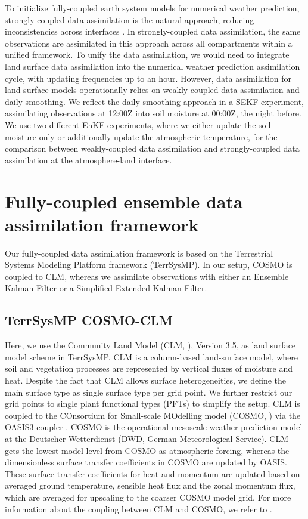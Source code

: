 \documentclass[hess, manuscript]{copernicus}
\begin{document}
To initialize fully-coupled earth system models for numerical weather prediction, strongly-coupled data assimilation is the natural approach, reducing inconsistencies across interfaces \citep{sawada_hydrometeorology_2018, lin_characteristics_2018, lin_examining_2019}.
In strongly-coupled data assimilation, the same observations are assimilated in this approach across all compartments within a unified framework.
To unify the data assimilation, we would need to integrate land surface data assimilation into the numerical weather prediction assimilation cycle, with updating frequencies up to an hour.
However, data assimilation for land surface models operationally relies on weakly-coupled data assimilation and daily smoothing.
We reflect the daily smoothing approach in a SEKF experiment, assimilating observations at 12:00Z into soil moisture at 00:00Z, the night before.
We use two different EnKF experiments, where we either update the soil moisture only or additionally update the atmospheric temperature, for the comparison between weakly-coupled data assimilation and strongly-coupled data assimilation at the atmosphere-land interface.

\section{Fully-coupled ensemble data assimilation framework}
Our fully-coupled data assimilation framework is based on the Terrestrial Systems Modeling Platform framework (TerrSysMP).
In our setup, COSMO is coupled to CLM, whereas we assimilate observations with either an Ensemble Kalman Filter or a Simplified Extended Kalman Filter.


\subsection{TerrSysMP COSMO-CLM}

Here, we use the Community Land Model (CLM, \citealt{oleson_technical_2004, oleson_k._w._improvements_2008}), Version 3.5, as land surface model scheme in TerrSysMP.
CLM is a column-based land-surface model, where soil and vegetation processes are represented by vertical fluxes of moisture and heat.
Despite the fact that CLM allows surface heterogeneities, we define the main surface type as single surface type per grid point.
We further restrict our grid points to single plant functional types (PFTs) to simplify the setup.
CLM is coupled to the COnsortium for Small-scale MOdelling model (COSMO, \citealt{baldauf_operational_2011}) via the OASIS3 coupler \citep{valcke_oasis3_2013}.
COSMO is the operational mesoscale weather prediction model at the Deutscher Wetterdienst (DWD, German Meteorological Service).
CLM gets the lowest model level from COSMO as atmospheric forcing, whereas the dimensionless surface transfer coefficients in COSMO are updated by OASIS.
These surface transfer coefficients for heat and momentum are updated based on averaged ground temperature, sensible heat flux and the zonal momentum flux, which are averaged for upscaling to the coarser COSMO model grid. 
For more information about the coupling between CLM and COSMO, we refer to \cite{shrestha_scale-consistent_2014}.
\end{document}
